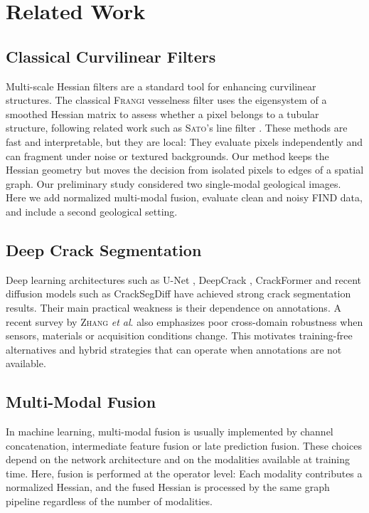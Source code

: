 \documentclass[conference,a4paper]{IEEEtran}
\newcommand{\Frangi}{\textnormal{\textsc{Frangi}}}
\begin{document}
\section{Related Work}

\subsection{Classical Curvilinear Filters}
Multi-scale Hessian filters are a standard tool for enhancing curvilinear structures. The classical \Frangi{} vesselness filter \cite{Frangi1998} uses the eigensystem of a smoothed Hessian matrix to assess whether a pixel belongs to a tubular structure, following related work such as \textsc{Sato}'s line filter \cite{Sato1998}. These methods are fast and interpretable, but they are local: They evaluate pixels independently and can fragment under noise or textured backgrounds. Our method keeps the Hessian geometry but moves the decision from isolated pixels to edges of a spatial graph.
Our preliminary study \cite{BibiStrasbourg} considered two single-modal geological images. Here we add normalized multi-modal fusion, evaluate clean and noisy FIND data, and include a second geological setting.

\subsection{Deep Crack Segmentation}
Deep learning architectures such as U-Net \cite{Unet2015}, DeepCrack \cite{DeepCrack2019}, CrackFormer \cite{CrackFormer2021} and recent diffusion models such as CrackSegDiff \cite{CrackSegDiff2024} have achieved strong crack segmentation results. Their main practical weakness is their dependence on annotations. A recent survey by \textsc{Zhang} \emph{et al}. \cite{Zhang2025Review} also emphasizes poor cross-domain robustness when sensors, materials or acquisition conditions change. This motivates training-free alternatives and hybrid strategies that can operate when annotations are not available.

\subsection{Multi-Modal Fusion}
In machine learning, multi-modal fusion is usually implemented by channel concatenation, intermediate feature fusion or late prediction fusion. These choices depend on the network architecture and on the modalities available at training time. Here, fusion is performed at the operator level: Each modality contributes a normalized Hessian, and the fused Hessian is processed by the same graph pipeline regardless of the number of modalities.
\end{document}
